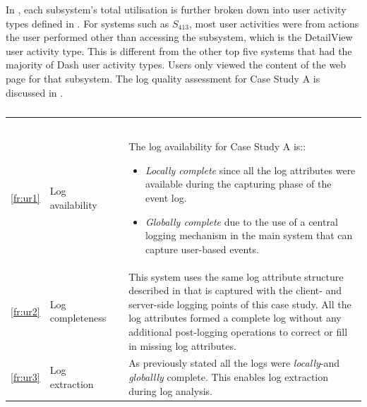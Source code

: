 In , each subsystem's total utilisation is further broken down into user activity types defined in . For systems such as $S_{413}$, most user activities were from actions the user performed other than accessing the subsystem, which is the DetailView user activity type. This is different from the other top five systems that had the majority of Dash user activity types. Users only viewed the content of the web page for that subsystem. The log quality assessment for Case Study A is discussed in .

\begin{xltabular}{\textwidth}{clcX}
	\caption[Logging quality assessment of Case Study A]{\textit{Logging quality assessment of the test system}}\label{tbl:ch3_caseAQuality}\\
	\toprule
	 &  &  &  \\
	\midrule
	\endfirsthead

	\caption[]{\continueCaption} \\
	\toprule
	 &  &  &  \\
	\midrule
	\endhead

	\midrule
	 \\ 
	\endfoot
	\endlastfoot

	\ref{fr:ur1} & Log availability & \cmark & \RaggedRight The log availability for Case Study A is::
		\begin{itemize}
			\item \textit{Locally complete} since all the log attributes were available during the capturing phase of the event log. 
			\item \textit{Globally complete} due to the use of a central logging mechanism in the main system that can capture user-based events.  
		\end{itemize} \\
	\ref{fr:ur2} & Log completeness & \cmark & This system uses the same log attribute structure described in  that is captured with the client- and server-side logging points of this case study. All the log attributes formed a complete log without any additional post-logging operations to correct or fill in missing log attributes. \\
	\ref{fr:ur3} & Log extraction & \cmark & As previously stated all the logs were \textit{locally}-and \textit{globallly} complete. This enables log extraction during log analysis. \\
	\bottomrule
\end{xltabular}

